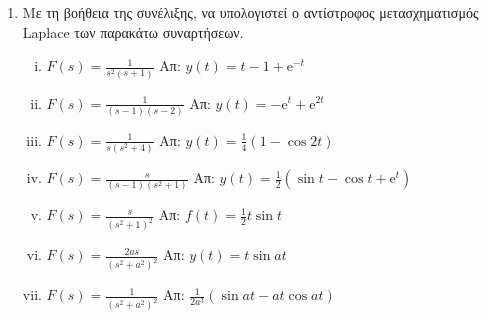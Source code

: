\begin{enumerate}
  \item Με τη βοήθεια της συνέλιξης, να υπολογιστεί ο αντίστροφος μετασχηματισμός 
    Laplace των παρακάτω συναρτήσεων.
    \begin{enumerate}[i)]
      \item $ F(s) = \frac{1}{s^{2}(s+1)} $ \hfill Απ: $ y(t) = t-1+ \mathrm{e}^{-t} $ 
      \item $ F(s) = \frac{1}{(s-1)(s-2)} $ \hfill Απ: $ y(t) = - \mathrm{e}^{t} +
        \mathrm{e}^{2t} $ 
      \item $ F(s) = \frac{1}{s(s^{2}+4)} $ \hfill Απ: $ y(t) = \frac{1}{4} (1-
        \cos{2t}) $ 
      \item $ F(s) = \frac{s}{(s-1)(s^{2}+1)} $ \hfill Απ: $ y(t) = \frac{1}{2}
        (\sin{t} - \cos{t} + \mathrm{e}^{t}) $  
      \item $ F(s) = \frac{s}{(s^{2}+1)^{2}}$ \hfill Απ: $f(t) = \frac{1}{2}t\sin{t}$ 
      \item $ F(s) = \frac{2 a s}{(s^{2}+a^{2})^{2}} $ \hfill Απ: $ y(t) = t \sin{at} $  
      \item\label{it:conv1} 
        $ F(s) = \frac{1}{(s^{2}+a^{2})^{2}} $ \hfill Απ: $ \frac{1}{2a^{3}} 
        (\sin{at} - at \cos{at}) $ 
    \end{enumerate}
\end{enumerate}


    
